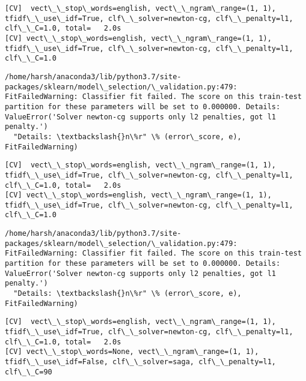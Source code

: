 \documentclass[11pt]{article}
\begin{document}
    \begin{Verbatim}[commandchars=\\\{\}]
[CV]  vect\_\_stop\_words=english, vect\_\_ngram\_range=(1, 1), tfidf\_\_use\_idf=True, clf\_\_solver=newton-cg, clf\_\_penalty=l1, clf\_\_C=1.0, total=   2.0s
[CV] vect\_\_stop\_words=english, vect\_\_ngram\_range=(1, 1), tfidf\_\_use\_idf=True, clf\_\_solver=newton-cg, clf\_\_penalty=l1, clf\_\_C=1.0 

    \end{Verbatim}

    \begin{Verbatim}[commandchars=\\\{\}]
/home/harsh/anaconda3/lib/python3.7/site-packages/sklearn/model\_selection/\_validation.py:479: FitFailedWarning: Classifier fit failed. The score on this train-test partition for these parameters will be set to 0.000000. Details: 
ValueError('Solver newton-cg supports only l2 penalties, got l1 penalty.')
  "Details: \textbackslash{}n\%r" \% (error\_score, e), FitFailedWarning)

    \end{Verbatim}

    \begin{Verbatim}[commandchars=\\\{\}]
[CV]  vect\_\_stop\_words=english, vect\_\_ngram\_range=(1, 1), tfidf\_\_use\_idf=True, clf\_\_solver=newton-cg, clf\_\_penalty=l1, clf\_\_C=1.0, total=   2.0s
[CV] vect\_\_stop\_words=english, vect\_\_ngram\_range=(1, 1), tfidf\_\_use\_idf=True, clf\_\_solver=newton-cg, clf\_\_penalty=l1, clf\_\_C=1.0 

    \end{Verbatim}

    \begin{Verbatim}[commandchars=\\\{\}]
/home/harsh/anaconda3/lib/python3.7/site-packages/sklearn/model\_selection/\_validation.py:479: FitFailedWarning: Classifier fit failed. The score on this train-test partition for these parameters will be set to 0.000000. Details: 
ValueError('Solver newton-cg supports only l2 penalties, got l1 penalty.')
  "Details: \textbackslash{}n\%r" \% (error\_score, e), FitFailedWarning)

    \end{Verbatim}

    \begin{Verbatim}[commandchars=\\\{\}]
[CV]  vect\_\_stop\_words=english, vect\_\_ngram\_range=(1, 1), tfidf\_\_use\_idf=True, clf\_\_solver=newton-cg, clf\_\_penalty=l1, clf\_\_C=1.0, total=   2.0s
[CV] vect\_\_stop\_words=None, vect\_\_ngram\_range=(1, 1), tfidf\_\_use\_idf=False, clf\_\_solver=saga, clf\_\_penalty=l1, clf\_\_C=90 

    \end{Verbatim}
\end{document}
